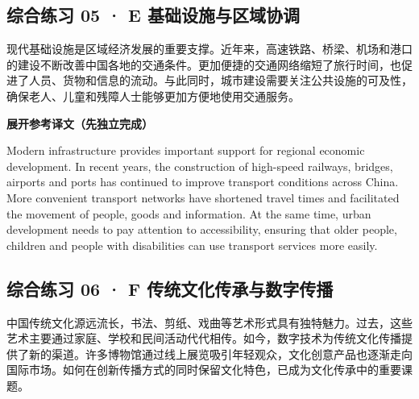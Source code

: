 \documentclass[a4paper,11pt,UTF8,fontset=none]{ctexart}
\begin{document}
\vspace{4pt}

\subsection{综合练习 05 · E 基础设施与区域协调}

\par

\noindent 现代基础设施是区域经济发展的重要支撑。近年来，高速铁路、桥梁、机场和港口的建设不断改善中国各地的交通条件。更加便捷的交通网络缩短了旅行时间，也促进了人员、货物和信息的流动。与此同时，城市建设需要关注公共设施的可及性，确保老人、儿童和残障人士能够更加方便地使用交通服务。\par

\noindent\colorbox{HeadBlue}{\strut {\bfseries 展开参考译文（先独立完成）}}\par\vspace{1pt}

\noindent Modern infrastructure provides important support for regional economic development. In recent years, the construction of high-speed railways, bridges, airports and ports has continued to improve transport conditions across China. More convenient transport networks have shortened travel times and facilitated the movement of people, goods and information. At the same time, urban development needs to pay attention to accessibility, ensuring that older people, children and people with disabilities can use transport services more easily.\par

\vspace{4pt}

\subsection{综合练习 06 · F 传统文化传承与数字传播}

\par

\noindent 中国传统文化源远流长，书法、剪纸、戏曲等艺术形式具有独特魅力。过去，这些艺术主要通过家庭、学校和民间活动代代相传。如今，数字技术为传统文化传播提供了新的渠道。许多博物馆通过线上展览吸引年轻观众，文化创意产品也逐渐走向国际市场。如何在创新传播方式的同时保留文化特色，已成为文化传承中的重要课题。\par
\end{document}
